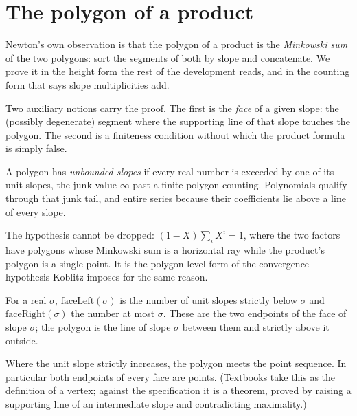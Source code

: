 \section{The polygon of a product}

Newton's own observation is that the polygon of a product is the \emph{Minkowski sum} of the two
polygons: sort the segments of both by slope and concatenate.  We prove it in the height form the
rest of the development reads, and in the counting form that says slope multiplicities add.

Two auxiliary notions carry the proof.  The first is the \emph{face} of a given slope: the
(possibly degenerate) segment where the supporting line of that slope touches the polygon.  The
second is a finiteness condition without which the product formula is simply false.

\begin{definition}
  \label{def:slopesunbounded}
  \leanok
  A polygon has \emph{unbounded slopes} if every real number is exceeded by one of its unit
  slopes, the junk value $\infty$ past a finite polygon counting.  Polynomials qualify through
  that junk tail, and entire series because their coefficients lie above a line of every slope.
\end{definition}

The hypothesis cannot be dropped: $(1 - X)\sum_i X^i = 1$, where the two factors have polygons
whose Minkowski sum is a horizontal ray while the product's polygon is a single point.  It is the
polygon-level form of the convergence hypothesis Koblitz imposes for the same reason.

\begin{definition}
  \label{def:face}
  \leanok
  For a real $\sigma$, $\mathrm{faceLeft}(\sigma)$ is the number of unit slopes strictly below
  $\sigma$ and $\mathrm{faceRight}(\sigma)$ the number at most $\sigma$.  These are the two
  endpoints of the face of slope $\sigma$; the polygon is the line of slope $\sigma$ between them
  and strictly above it outside.
\end{definition}

\begin{proposition}
  \label{prop:vertex-is-point}
  \leanok
  Where the unit slope strictly increases, the polygon meets the point sequence.  In particular
  both endpoints of every face are points.  (Textbooks take this as the definition of a vertex;
  against the specification it is a theorem, proved by raising a supporting line of an
  intermediate slope and contradicting maximality.)
\end{proposition}

